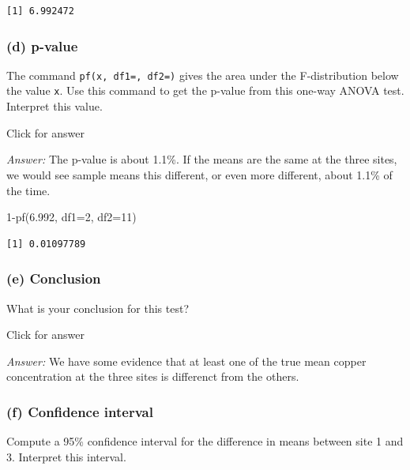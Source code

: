 \documentclass[
]{book}
\newenvironment{Shaded}{\begin{snugshade}}{\end{snugshade}}
\newcommand{\AttributeTok}[1]{\textcolor[rgb]{0.77,0.63,0.00}{#1}}
\newcommand{\DecValTok}[1]{\textcolor[rgb]{0.00,0.00,0.81}{#1}}
\newcommand{\FloatTok}[1]{\textcolor[rgb]{0.00,0.00,0.81}{#1}}
\newcommand{\FunctionTok}[1]{\textcolor[rgb]{0.00,0.00,0.00}{#1}}
\newcommand{\NormalTok}[1]{#1}
\newcommand{\SpecialCharTok}[1]{\textcolor[rgb]{0.00,0.00,0.00}{#1}}
\begin{document}
\begin{verbatim}
[1] 6.992472
\end{verbatim}

\hypertarget{d-p-value}{%
\subsubsection{(d) p-value}\label{d-p-value}}

The command \texttt{pf(x,\ df1=,\ df2=)} gives the area under the F-distribution below the value \texttt{x}. Use this command to get the p-value from this one-way ANOVA test. Interpret this value.

Click for answer

\emph{Answer:} The p-value is about 1.1\%. If the means are the same at the three sites, we would see sample means this different, or even more different, about 1.1\% of the time.

\begin{Shaded}
\begin{Highlighting}[]
\DecValTok{1}\SpecialCharTok{{-}}\FunctionTok{pf}\NormalTok{(}\FloatTok{6.992}\NormalTok{, }\AttributeTok{df1=}\DecValTok{2}\NormalTok{, }\AttributeTok{df2=}\DecValTok{11}\NormalTok{)}
\end{Highlighting}
\end{Shaded}

\begin{verbatim}
[1] 0.01097789
\end{verbatim}

\hypertarget{e-conclusion}{%
\subsubsection{(e) Conclusion}\label{e-conclusion}}

What is your conclusion for this test?

Click for answer

\emph{Answer:} We have some evidence that at least one of the true mean copper concentration at the three sites is differenct from the others.

\hypertarget{f-confidence-interval}{%
\subsubsection{(f) Confidence interval}\label{f-confidence-interval}}

Compute a 95\% confidence interval for the difference in means between site 1 and 3. Interpret this interval.
\end{document}
